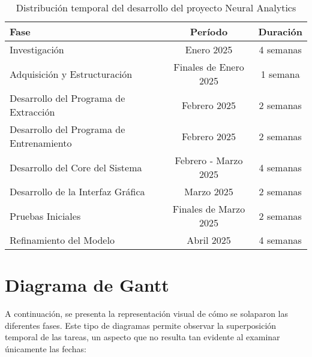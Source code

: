 \begin{table}[ht]
    \centering
    \begin{tabular}{|l|c|c|}
        \hline
        \textbf{Fase} & \textbf{Período} & \textbf{Duración} \\
        \hline
        Investigación & Enero 2025 & 4 semanas \\
        \hline
        Adquisición y Estructuración & Finales de Enero 2025 & 1 semana \\
        \hline
        Desarrollo del Programa de Extracción & Febrero 2025 & 2 semanas \\
        \hline
        Desarrollo del Programa de Entrenamiento & Febrero 2025 & 2 semanas \\
        \hline
        Desarrollo del Core del Sistema & Febrero - Marzo 2025 & 4 semanas \\
        \hline
        Desarrollo de la Interfaz Gráfica & Marzo 2025 & 2 semanas \\
        \hline
        Pruebas Iniciales & Finales de Marzo 2025 & 2 semanas \\
        \hline
        Refinamiento del Modelo & Abril 2025 & 4 semanas \\
        \hline
    \end{tabular}
    \caption{Distribución temporal del desarrollo del proyecto Neural Analytics}
    \label{tab:temporal_distribution}
\end{table}

\newpage
\section{Diagrama de Gantt}

A continuación, se presenta la representación visual de cómo se solaparon las diferentes fases. Este tipo de diagramas permite observar la superposición temporal de las tareas, un aspecto que no resulta tan evidente al examinar únicamente las fechas:


